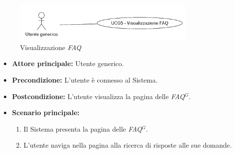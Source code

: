 \newpage
{}

\label{usecase:Visualizzazione FAQ}

\begin{figure}[h]
	\centering
	\includegraphics[width=0.8\textwidth]{./uml/UCG5.png} 
	\caption{Visualizzazione \textit{FAQ}}
	\label{fig:UCG5}
  \end{figure}

\begin{itemize}
	\item \textbf{Attore principale:} Utente generico.


	\item \textbf{Precondizione:}
	      L'utente è connesso al Sistema.

	\item \textbf{Postcondizione:} L'utente visualizza la pagina delle \textit{\ac{FAQ}$^G$}.

	\item \textbf{Scenario principale:}
	      \begin{enumerate}
              \item Il Sistema presenta la pagina delle \textit{\ac{FAQ}$^G$}.
              \item L'utente naviga nella pagina alla ricerca di risposte alle sue domande.
		    
	      \end{enumerate}
\end{itemize}